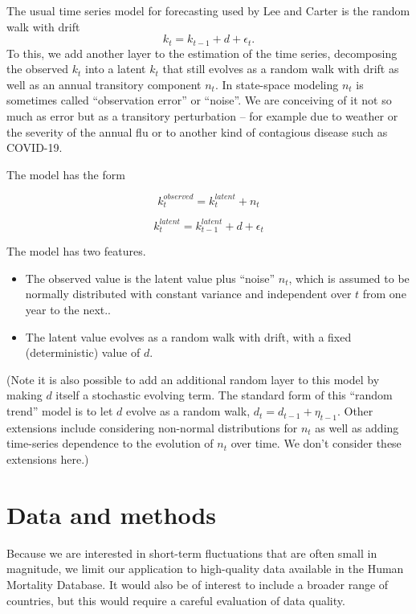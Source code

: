 \documentclass[12pt]{article}
\begin{document}
The usual time series model for forecasting used by Lee and Carter is
the random walk with drift
$$
k_t = k_{t-1} + d + \epsilon_t.
$$
To this, we add another layer to the estimation of the time series,
decomposing the observed $k_t$ into a latent $k_t$ that still evolves as a
random walk with drift as well as an annual transitory component $n_t$. In
state-space modeling $n_t$ is sometimes called ``observation
error'' or ``noise''. We are conceiving of it not so much as error but as a
transitory perturbation -- for example due to weather or the severity
of the annual flu or to another kind of contagious disease such as
COVID-19.

The model has the form

\begin{equation}
  k_t^{observed} = k_t^{latent} + n_t
\end{equation}

\begin{equation}
  k_t^{latent} = k_{t-1}^{latent} + d + \epsilon_t
\end{equation}

The model has two features.
\begin{itemize}
\item The observed value is the latent value plus ``noise'' $n_t$,
  which is assumed to be normally distributed with constant variance
  and independent over $t$ from one year to the next..

  \item The latent value evolves as a random walk with drift, with a
    fixed (deterministic) value of $d$.
\end{itemize}

(Note it is also possible to add an additional random layer to this
model by making $d$ itself a stochastic evolving term. The standard
form of this ``random trend'' model is to let $d$ evolve as a random
walk, $d_t = d_{t-1} + \eta_{t-1}$.  Other extensions include
considering non-normal distributions for $n_t$ as well as adding
time-series dependence to the evolution of $n_t$ over time. We don't
consider these extensions here.)

\section{Data and methods}

Because we are interested in short-term fluctuations that are often
small in magnitude, we limit our application to high-quality
data available in the Human Mortality Database. It would also be of
interest to include a broader range of countries, but this would
require a careful evaluation of data quality.
\end{document}
